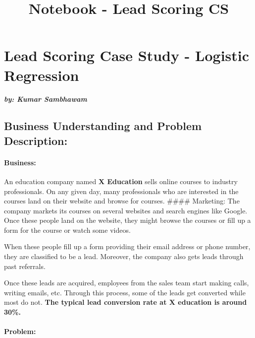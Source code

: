 \documentclass[11pt]{article}
\title{Notebook - Lead Scoring CS}
\begin{document}
    
    \maketitle
    
    

    
    \hypertarget{lead-scoring-case-study---logistic-regression}{%
\section{ Lead Scoring Case Study - Logistic
Regression}\label{lead-scoring-case-study---logistic-regression}}

\hypertarget{by-kumar-sambhawam}{%
\subparagraph{by: Kumar Sambhawam}\label{by-kumar-sambhawam}}

\hypertarget{business-understanding-and-problem-description}{%
\subsection{Business Understanding and Problem
Description:}\label{business-understanding-and-problem-description}}

\hypertarget{business}{%
\paragraph{Business:}\label{business}}

An education company named \textbf{X Education} sells online courses to
industry professionals. On any given day, many professionals who are
interested in the courses land on their website and browse for courses.
\#\#\#\# Marketing: The company markets its courses on several websites
and search engines like Google. Once these people land on the website,
they might browse the courses or fill up a form for the course or watch
some videos.

When these people fill up a form providing their email address or phone
number, they are classified to be a lead. Moreover, the company also
gets leads through past referrals.

Once these leads are acquired, employees from the sales team start
making calls, writing emails, etc. Through this process, some of the
leads get converted while most do not. \textbf{The typical lead
conversion rate at X education is around 30\%.}

\hypertarget{problem}{%
\paragraph{Problem:}\label{problem}}
\end{document}
